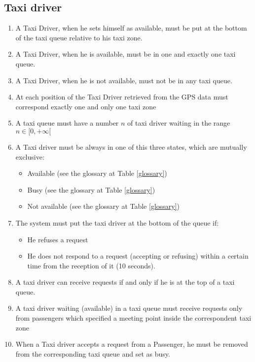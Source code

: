 \subsection{Taxi driver}
\begin{enumerate}
\item A Taxi Driver, when he sets himself as available, must be put at the bottom of the taxi queue relative to his taxi zone.
\item A Taxi Driver, when he is available, must be in one and exactly one taxi queue.
\item A Taxi Driver, when he is not available, must not be in any taxi queue.
\item At each position of the Taxi Driver retrieved from the GPS data must correspond exactly one and only one taxi zone
\item A taxi queue must have a number $n$ of taxi driver waiting in the range $n\in[0,+\infty[$
\item A Taxi driver must be always in one of this three states, which are mutually exclusive:
\begin{itemize}
	\item Available (see the glossary at Table \ref{glossary})
	\item Busy (see the glossary at Table \ref{glossary})
	\item Not available	(see the glossary at Table \ref{glossary})
\end{itemize}
\item The system must put the taxi driver at the bottom of the queue if:
\begin{itemize}
	\item He refuses a request
	\item He does not respond to a request (accepting or refusing) within a certain time from the reception of it (10 seconds).
\end{itemize}
\item A taxi driver can receive requests if and only if he is at the top of a taxi queue.
\item A taxi driver waiting (available) in a taxi queue must receive requests only from passengers which specified a meeting point inside the correspondent taxi zone
\item When a Taxi driver accepts a request from a Passenger, he must be removed from the corresponding taxi queue and set as busy.
\end{enumerate}